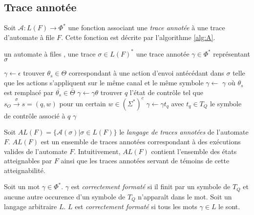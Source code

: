 
\subsection{Trace annotée}\label{trace:annot}

Soit $\mathcal{A}:L(F)\rightarrow\Phi^*$ une fonction associant une \emph{trace annotée} à une trace d'automate à file $F$. Cette fonction est décrite par l'algorithme \ref{alg:A}.

\begin{algorithm}[H]
  	\begin{algorithmic}[1]
    \REQUIRE un automate à files \fifo , une trace $\sigma\in L(F)^*$
		\ENSURE une trace annotée $\gamma\in\Phi^*$ représentant $\sigma$

    \STATE $\gamma\leftarrow\epsilon$
        \STATE trouver $\theta_s\in\Theta$ correspondant à une action d'envoi antécédant dans $\sigma$ telle que les actions s'appliquent sur le même canal et le même symbole
        \STATE $\gamma\leftarrow$ $\gamma$ où $\theta_s$ est remplacé par $\bar{\theta_s}\in\bar{\Theta}$ 
        \STATE $\gamma\leftarrow\gamma\theta$
      \ENDIF
    \ENDFOR
    \STATE trouver $q$ l'état de contrôle tel que $s_O\xrightarrow{\sigma}s=(q,w)$ pour un certain $w\in(\Sigma^*)^c$
    \STATE $\gamma\leftarrow\gamma t_q$ avec $t_q\in T_Q$ le symbole de contrôle associé à $q$
		\RETURN $\gamma$
	\end{algorithmic}
	\caption{$\mathcal{A}:L(F)^*\rightarrow\Phi^*$}\label{alg:A}
\end{algorithm}

Soit $AL(F)=\{\mathcal{A}(\sigma)|\sigma \in L(F)\}$ le \emph{langage de traces annotées} de l'automate $F$. $AL(F)$ est un ensemble de traces annotées correspondant à des exécutions valides de l'automate $F$. Intuitivement, $AL(F)$ contient l'ensemble des états atteignables par $F$ ainsi que les traces annotées servant de témoins de cette atteignabilité.

Soit un mot $\gamma \in \Phi^*$. $\gamma$ est \emph{correctement formaté} si il finit par un symbole de $T_Q$ et aucune autre occurence d'un symbole de $T_Q$ n'apparaît dans le mot. Soit un langage arbitraire $L$. $L$ est \emph{correctement formaté} si tous les mots $\gamma\in L$ le sont.


